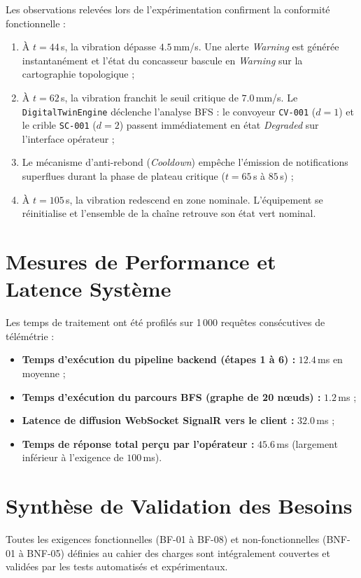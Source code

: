 Les observations relevées lors de l'expérimentation confirment la conformité fonctionnelle :
\begin{enumerate}
    \item À $t = 44$\,s, la vibration dépasse $4.5$\,mm/s. Une alerte \textit{Warning} est générée instantanément et l'état du concasseur bascule en \textit{Warning} sur la cartographie topologique ;
    \item À $t = 62$\,s, la vibration franchit le seuil critique de $7.0$\,mm/s. Le \texttt{DigitalTwinEngine} déclenche l'analyse BFS : le convoyeur \texttt{CV-001} ($d=1$) et le crible \texttt{SC-001} ($d=2$) passent immédiatement en état \textit{Degraded} sur l'interface opérateur ;
    \item Le mécanisme d'anti-rebond (\textit{Cooldown}) empêche l'émission de notifications superflues durant la phase de plateau critique ($t = 65$\,s à $85$\,s) ;
    \item À $t = 105$\,s, la vibration redescend en zone nominale. L'équipement se réinitialise et l'ensemble de la chaîne retrouve son état vert nominal.
\end{enumerate}

\section{Mesures de Performance et Latence Système}

Les temps de traitement ont été profilés sur 1\,000 requêtes consécutives de télémétrie :
\begin{itemize}
    \item \textbf{Temps d'exécution du pipeline backend (étapes 1 à 6) :} $12.4$\,ms en moyenne ;
    \item \textbf{Temps d'exécution du parcours BFS (graphe de 20 nœuds) :} $1.2$\,ms ;
    \item \textbf{Latence de diffusion WebSocket SignalR vers le client :} $32.0$\,ms ;
    \item \textbf{Temps de réponse total perçu par l'opérateur :} $45.6$\,ms (largement inférieur à l'exigence de $100$\,ms).
\end{itemize}

\section{Synthèse de Validation des Besoins}

Toutes les exigences fonctionnelles (BF-01 à BF-08) et non-fonctionnelles (BNF-01 à BNF-05) définies au cahier des charges sont intégralement couvertes et validées par les tests automatisés et expérimentaux.
